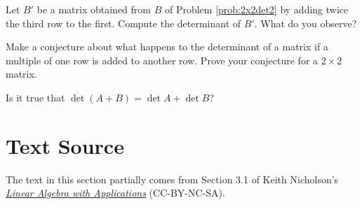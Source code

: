 \documentclass{ximera}
\begin{document}
\begin{problem}\label{prob:scalarmultofrow}
Let $B'$ be a matrix obtained from $B$ of Problem \ref{prob:2x2det2} by adding twice the third row to the first.  Compute the determinant of $B'$.  What do you observe?
\end{problem}

\begin{problem}\label{prob:scalarmultofrow2x2}
Make a conjecture about what happens to the determinant of a matrix if a multiple of one row is added to another row.  Prove your conjecture for a $2\times 2$ matrix.
\end{problem}

\begin{problem}\label{prob:detsumsumdetquestion}
Is it true that 
$\det{(A+B)}=\det{A}+\det{B}$?
\end{problem}

\section*{Text Source}
The text in this section partially comes from Section 3.1  of Keith Nicholson's \href{https://open.umn.edu/opentextbooks/textbooks/linear-algebra-with-applications}{\it Linear Algebra with Applications} (CC-BY-NC-SA).
\end{document}
